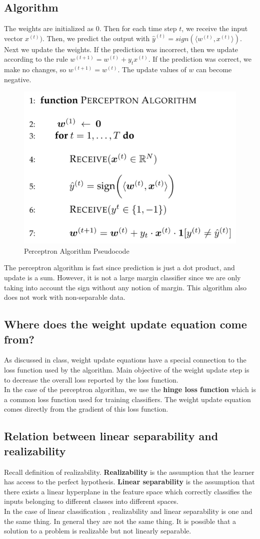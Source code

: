 \documentclass[11pt]{article}
\begin{document}
\subsection{Algorithm}
The weights are initialized as 0. Then for each time step $t$, we receive the input vector $x^{(t)})$. Then, we predict the output with $\hat{y}^{(t)} = sign(\langle w^{(t)}, x^{(t)} \rangle)$. Next we update the weights. If the prediction was incorrect, then we update according to the rule $w^{(t+1)} = w^{(t)} + y_t x^{(t)}$. If the prediction was correct, we make no changes, so $w^{(t+1)} = w^{(t)}$. The update values of $w$ can become negative.
\begin{figure}[H]
  \centering
  \includegraphics[width=0.5\linewidth]{perceptron_algo.png}
\caption{Perceptron Algorithm Pseudocode}
\label{fig:test}
\end{figure}

The perceptron algorithm is fast since prediction is just a dot product, and update is a sum. However, it is not a large margin classifier since we are only taking into account the sign without any notion of margin. This algorithm also does not work with non-separable data.\\

\subsection{Where does the weight update equation come from?}
As discussed in class, weight update equations have a special connection to the loss function used by the algorithm. Main objective of the weight update step is to decrease the overall loss reported by the loss function. \\
In the case of the perceptron algorithm, we use the \textbf{hinge loss function} which is a common loss function used for training classifiers. The weight update equation comes directly from the gradient of this loss function.

\subsection{Relation between linear separability and realizability}
Recall definition of realizability.  \textbf{Realizability} is the assumption that the learner has access to the perfect hypothesis. \textbf{Linear separability} is the assumption that there exists a linear hyperplane in the feature space which correctly classifies the inputs belonging to different classes into different spaces. \\
In the case of linear classification , realizability and linear separability is one and the same thing. In general they are not the same thing. It is possible that a solution to a problem is realizable but not linearly separable.
\end{document}
